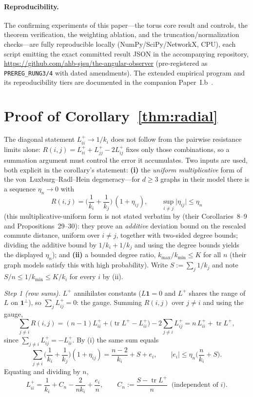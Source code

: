 \documentclass[review]{siamart220329}
\begin{document}
\paragraph{Reproducibility.} The confirming experiments of this paper---the torus
core result and controls, the theorem verification, the weighting ablation, and the
truncation/normalization checks---are fully reproducible locally
(NumPy/SciPy/NetworkX, CPU), each script emitting the exact committed result JSON in
the accompanying repository, \url{https://github.com/ahb-sjsu/the-angular-observer}
(pre-registered as \texttt{PREREG\_RUNG3/4} with dated amendments). The extended
empirical program and its reproducibility tiers are documented in the companion
Paper~I.b~\cite{paperIb}.

\appendix
\section{Proof of Corollary~\ref{thm:radial}}\label{app:radial}

The diagonal statement $L^+_{ii}\to1/k_i$ does not follow from the pairwise
resistance limits alone:
$R(i,j)=L^+_{ii}+L^+_{jj}-2L^+_{ij}$ fixes only those combinations, so a
summation argument must control the error it accumulates. Two inputs are used,
both explicit in the corollary's statement: \textbf{(i)} the \emph{uniform
multiplicative} form of the
von~Luxburg--Radl--Hein degeneracy---for $d\ge3$ graphs in their model there is
a sequence $\eta_n\to0$ with
\[
R(i,j)=\Big(\frac1{k_i}+\frac1{k_j}\Big)\,(1+\eta_{ij}),\qquad
\sup_{i\ne j}\lvert\eta_{ij}\rvert\le\eta_n
\]
(this multiplicative-uniform form is not stated verbatim by \cite{vonluxburg2014}
(their Corollaries~8--9 and Propositions~29--30):
they prove an \emph{additive} deviation bound on the rescaled commute distance,
uniform over $i\ne j$, together with two-sided degree bounds; dividing the
additive bound by $1/k_i+1/k_j$ and using the degree bounds yields the displayed
$\eta_n$); and \textbf{(ii)} a bounded degree ratio,
$k_{\max}/k_{\min}\le K$ for all $n$ (their graph models satisfy this with high
probability). Write $S:=\sum_j 1/k_j$ and note $S/n\le1/k_{\min}\le K/k_i$ for
every $i$ by (ii).

\emph{Step 1 (row sums).} $L^+$ annihilates constants ($L\mathbf1=0$ and
$L^+$ shares the range of $L$ on $\mathbf1^\perp$), so $\sum_j L^+_{ij}=0$: the
gauge. Summing $R(i,j)$ over $j\ne i$ and using the gauge,
\[
\sum_{j\ne i}R(i,j)
=(n-1)L^+_{ii}+\big(\operatorname{tr}L^+-L^+_{ii}\big)
-2\sum_{j\ne i}L^+_{ij}
=n\,L^+_{ii}+\operatorname{tr}L^+,
\]
since $\sum_{j\ne i}L^+_{ij}=-L^+_{ii}$. By (i) the same sum equals
\[
\sum_{j\ne i}\Big(\frac1{k_i}+\frac1{k_j}\Big)(1+\eta_{ij})
=\frac{n-2}{k_i}+S+e_i,
\qquad
\lvert e_i\rvert\le\eta_n\Big(\frac{n}{k_i}+S\Big).
\]
Equating and dividing by $n$,
\begin{equation}
L^{+}_{ii}=\frac1{k_i}+C_n-\frac{2}{n k_i}+\frac{e_i}{n},
\qquad
C_n:=\frac{S-\operatorname{tr}L^+}{n}\ \text{ (independent of $i$)} .
\tag{A.1}
\end{equation}
\end{document}
